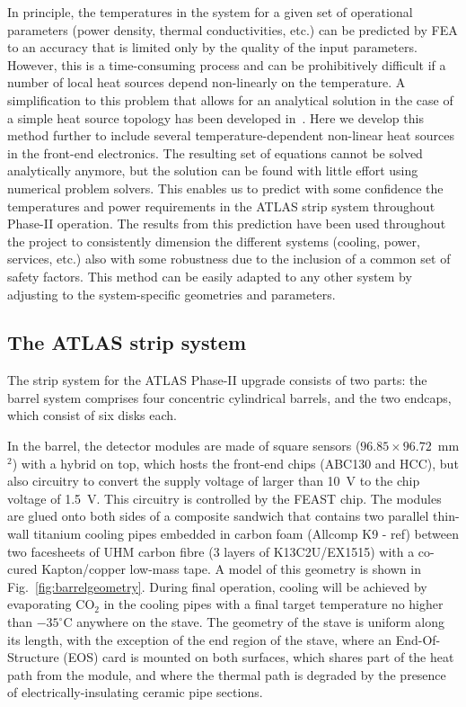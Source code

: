 In principle, the temperatures in the system for a given set of operational parameters (power density, thermal conductivities, etc.) can be predicted by FEA to an accuracy that is limited only by the quality of the input parameters. However, this is a time-consuming process and can be prohibitively difficult if a number of local heat sources depend non-linearly on the temperature. A simplification to this problem that allows for an analytical solution in the case of a simple heat source topology has been developed in~\cite{Beck:2010zzd}. Here we develop this method further to include several temperature-dependent non-linear heat sources in the front-end electronics. The resulting set of equations cannot be solved analytically anymore, but the solution can be found with little effort using numerical problem solvers. This enables us to predict with some confidence the temperatures and power requirements in the ATLAS strip system throughout Phase-II operation. The results from this prediction have been used throughout the project to consistently dimension the different systems (cooling, power, services, etc.) also with some robustness due to the inclusion of a common set of safety factors. This method can be easily adapted to any other system by adjusting to the system-specific geometries and parameters.

\subsection{The ATLAS strip system}
The strip system for the ATLAS Phase-II upgrade \cite{Collaboration:2017mtb} consists of two parts: the barrel system comprises four concentric cylindrical barrels, and the two endcaps, which consist of six disks each.

In the barrel, the detector modules are made of square sensors ($96.85\times 96.72$~mm$^2$) with a hybrid on top, which hosts the front-end chips (ABC130 and HCC), but also circuitry to convert the supply voltage of larger than 10~V to the chip voltage of 1.5~V. This circuitry is controlled by the FEAST chip. The modules are glued onto both sides of a composite sandwich that contains two parallel thin-wall titanium cooling pipes embedded in carbon foam (Allcomp K9 - ref)  between two facesheets of UHM carbon fibre (3 layers of K13C2U/EX1515) with a co-cured Kapton/copper low-mass tape. A model of this geometry is shown in Fig.~\ref{fig:barrelgeometry}. During final operation, cooling will be achieved by evaporating CO$_2$ in the cooling pipes with a final target temperature no higher than $-35^\circ$C anywhere on the stave. The geometry of the stave is uniform along its length, with the exception of the end region of the stave, where an End-Of-Structure (EOS) card is mounted on both surfaces, which shares part of the heat path from the module, and where the thermal path is degraded by the presence of electrically-insulating ceramic pipe sections. 

